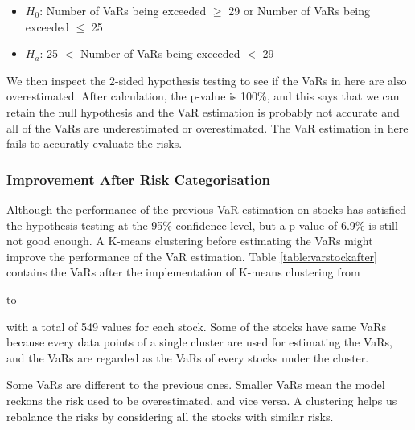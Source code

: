 \documentclass[11pt]{article} %
\theoremstyle{plain}
\theoremstyle{definition}
\begin{document}
\begin{itemize}
    \item \textsl{$H_0$}: Number of VaRs being exceeded $\geq$ 29 or Number of VaRs being exceeded $\leq$ 25
    \item \textsl{$H_a$}: 25 $<$ Number of VaRs being exceeded $<$ 29
\end{itemize}

We then inspect the 2-sided hypothesis testing to see if the VaRs in here are also overestimated. After calculation, the p-value is 100\%, and this says that we can retain the null hypothesis and the VaR estimation is probably not accurate and all of the VaRs are underestimated or overestimated. The VaR estimation in here fails to accuratly evaluate the risks.

\subsubsection{Improvement After Risk Categorisation}

Although the performance of the previous VaR estimation on stocks has satisfied the hypothesis testing at the 95\% confidence level, but a p-value of 6.9\% is still not good enough. A K-means clustering before estimating the VaRs might improve the performance of the VaR estimation. Table \ref{table:varstockafter} contains the VaRs after the implementation of K-means clustering from \date{26th May 2016} to \date{31st July 2018} with a total of 549 values for each stock. Some of the stocks have same VaRs because every data points of a single cluster are used for estimating the VaRs, and the VaRs are regarded as the VaRs of every stocks under the cluster.

Some VaRs are different to the previous ones. Smaller VaRs mean the model reckons the risk used to be overestimated, and vice versa. A clustering helps us rebalance the risks by considering all the stocks with similar risks.
\end{document}

